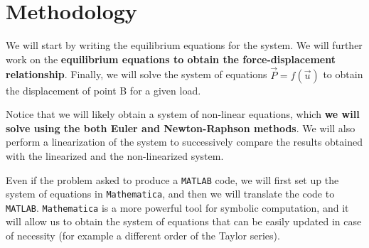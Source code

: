 \section{Methodology}
\label{sec:methodology}

We will start by writing the equilibrium equations for the system.
We will further work on the \textbf{equilibrium equations to obtain the force-displacement relationship}.
Finally, we will solve the system of equations ${\vec{P}} = f({\vec{u}})$ to obtain the displacement of point B for a given load.

Notice that we will likely obtain a system of non-linear equations, which \textbf{we will solve using the both Euler and Newton-Raphson methods}.
We will also perform a linearization of the system to successively compare the results obtained with the linearized and the non-linearized system.

Even if the problem asked to produce a \texttt{MATLAB} code, we will first set up the system of equations in \texttt{Mathematica}, and then we will translate the code to \texttt{MATLAB}.
\texttt{Mathematica} is a more powerful tool for symbolic computation, and it will allow us to obtain the system of equations that can be easily updated in case of necessity (for example a different order of the Taylor series).

